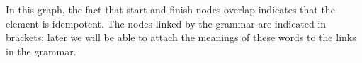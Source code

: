 \documentclass[12pt]{report}
\begin{document}
In this graph, the fact that start and finish nodes overlap indicates that the element is idempotent. The nodes linked by the grammar are indicated in brackets; later we will be able to attach the meanings of these words to the links in the grammar.





\end{document}
